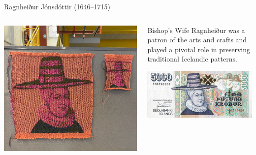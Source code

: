 \documentclass[
    NAME={Dr. Helga Ingimundardóttir},
    EMAIL={helgaingim@hi.is},
    FACULTY={Industrial Engineering},
    TITLE={HiDef Textiles: Reviving Tradition with Innovation},
    SUBTITLE={Empowering Creativity and Sustainability in Textile Production through Digital Transformation},
    SEMINAR={Reykjavík DataBeers},
    DATE={January 25, 2025},
    WIDE={true}
]{HI-LaTeX/hi-beamer}
\begin{document}
    \begin{frame}{Ragnheiður Jónsdóttir (1646--1715)}
        \begin{columns}
            \begin{column}{.5\linewidth}
                \includegraphics[width=\linewidth]{include/ragnheidur.png}
            \end{column}
            \begin{column}{.5\linewidth}
                \begin{block}{Bishop's Wife}
                    Ragnheiður was a patron of the arts and crafts and played a pivotal role in preserving traditional Icelandic patterns.
                \end{block}
                \centering
                \includegraphics[width=.7\linewidth]{include/5000kr.JPG}
            \end{column}
        \end{columns}
    \end{frame}
\end{document}

